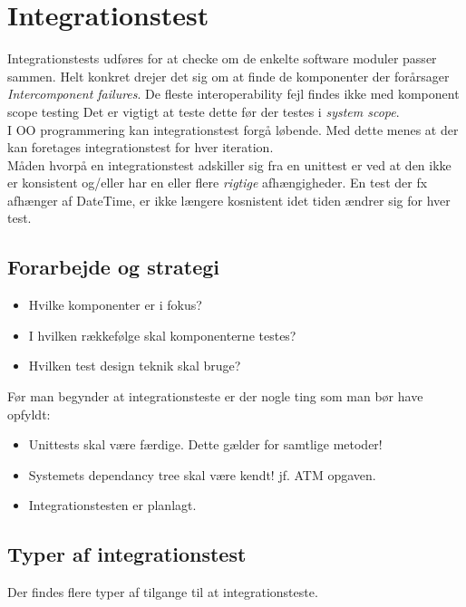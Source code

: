 \section{Integrationstest}
Integrationstests udføres for at checke om de enkelte software moduler passer sammen. Helt konkret drejer det sig om at finde de komponenter der forårsager \textit{Intercomponent failures}. De fleste interoperability fejl findes ikke med komponent scope testing Det er vigtigt at teste dette før der testes i \textit{system scope}.\\

I OO programmering kan integrationstest forgå løbende. Med dette menes at der kan foretages integrationstest for hver iteration. \\

Måden hvorpå en integrationstest adskiller sig fra en unittest er ved at den ikke er konsistent og/eller har en eller flere \textit{rigtige} afhængigheder. En test der fx afhænger af DateTime, er ikke længere kosnistent idet tiden ændrer sig for hver test.

\subsection{Forarbejde og strategi}

\begin{itemize}
	\item Hvilke komponenter er i fokus?
	\item I hvilken rækkefølge skal komponenterne testes?
	\item Hvilken test design teknik skal bruge?
\end{itemize}

Før man begynder at integrationsteste er der nogle ting som man bør have opfyldt:

\begin{itemize}
	\item Unittests skal være færdige. Dette gælder for samtlige metoder!
	\item Systemets dependancy tree skal være kendt! jf. ATM opgaven.
	\item Integrationstesten er planlagt.
\end{itemize}

\subsection{Typer af integrationstest}
Der findes flere typer af tilgange til at integrationsteste.


